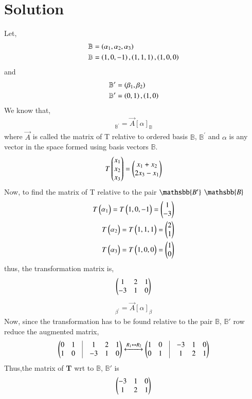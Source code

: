 \documentclass[journal,12pt,twocolumn]{IEEEtran}
\begin{document}
\section{\textbf{Solution}}
Let,
\begin{align}
\mathbb{B} &= \left(\alpha_1,\alpha_2,\alpha_3\right)\\
\mathbb{B} &= {\left(1,0,-1\right),\left(1,1,1\right),\left(1,0,0\right)}
\end{align}
and
\begin{align}
    \mathbb{B'} &= \left(\beta_1,\beta_2\right)\nonumber\\
 \mathbb{B'}   &={\left(0,1\right),\left(1,0\right)}
\end{align}
We know that,
\begin{align}
[T\alpha]_{\mathbb{B}^{'}}=\vec{A}[\alpha]_{\mathbb{B}}\label{T}
\end{align}
where $\vec{A}$ is called the matrix of T relative to ordered basis $\mathbb{B}$, $\mathbb{B}^{'}$ and $\alpha$ is any vector in the space formed using basis vectors $\mathbb{B}$.
\begin{align}
T\begin{pmatrix}x_1\\x_2\\x_3\end{pmatrix}=\begin{pmatrix}x_1+x_2\\2x_3-x_1\end{pmatrix}
\end{align}
Now, to find the matrix of T relative to the pair $\mathsbb{B'}$ $\mathsbb{B}$ 
\begin{align}
T\begin{pmatrix}\alpha_1\end{pmatrix}=T\begin{pmatrix}1,0,-1\end{pmatrix}=\begin{pmatrix}1\\-3\end{pmatrix}\nonumber\\
T\begin{pmatrix}\alpha_2\end{pmatrix}=T\begin{pmatrix}1,1,1\end{pmatrix}=\begin{pmatrix}2\\1\end{pmatrix}\nonumber\\
T\begin{pmatrix}\alpha_3\end{pmatrix}=T\begin{pmatrix}1,0,0\end{pmatrix}=\begin{pmatrix}1\\0\end{pmatrix}
\end{align}
thus, the transformation matrix is,
\begin{align}
\begin{pmatrix}1&2&1\\-3&1&0\end{pmatrix}
\end{align}
\begin{align}
[T\alpha]_{\beta^{'}}=\vec{A}[\alpha]_{\beta}\label{T}
\end{align}
Now, since the transformation has to be found relative to the pair $\mathbb{B}$, $\mathbb{B'}$ row reduce the augmented matrix,
\begin{align}
\myvec{0&1&\vline&1&2&1\\1&0&\vline&-3&1&0}\xleftrightarrow{R_1\leftrightarrow R_2}\myvec{1&0&\vline&-3&1&0\\0&1&\vline&1&2&1}
\end{align}
Thus,the matrix of \textbf{T} wrt to $\mathbb{B}$, $\mathbb{B'}$ is 
\begin{align}
\begin{pmatrix}-3&1&0\\1&2&1\end{pmatrix}
\end{align}
\end{document}
